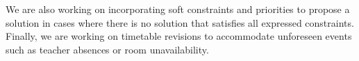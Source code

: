 We are also working on incorporating soft constraints and priorities to propose a solution in cases where there is no solution that satisfies all expressed constraints. 
Finally, we are working on timetable revisions to accommodate unforeseen events such as teacher absences or room unavailability.
